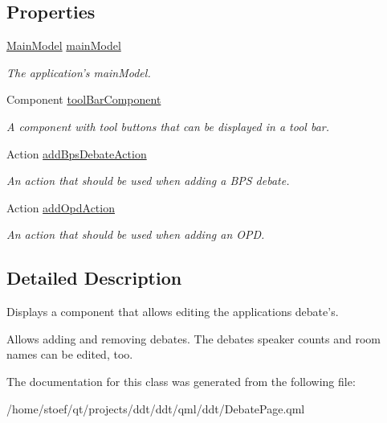 \subsection*{Properties}
\begin{DoxyCompactItemize}
\item 
\hypertarget{classDebatePage_a2591e3863cd1d80095d1c2a259bcf77b}{\hyperlink{classMainModel}{Main\-Model} \hyperlink{classDebatePage_a2591e3863cd1d80095d1c2a259bcf77b}{main\-Model}}\label{classDebatePage_a2591e3863cd1d80095d1c2a259bcf77b}

\begin{DoxyCompactList}\small\item\em The application's main\-Model. \end{DoxyCompactList}\item 
\hypertarget{classDebatePage_a6c33a9ff03852ccd00fd1a4b0ce88930}{Component \hyperlink{classDebatePage_a6c33a9ff03852ccd00fd1a4b0ce88930}{tool\-Bar\-Component}}\label{classDebatePage_a6c33a9ff03852ccd00fd1a4b0ce88930}

\begin{DoxyCompactList}\small\item\em A component with tool buttons that can be displayed in a tool bar. \end{DoxyCompactList}\item 
\hypertarget{classDebatePage_acbf69a0adb66d050aeea3f0e3b72c57d}{Action \hyperlink{classDebatePage_acbf69a0adb66d050aeea3f0e3b72c57d}{add\-Bps\-Debate\-Action}}\label{classDebatePage_acbf69a0adb66d050aeea3f0e3b72c57d}

\begin{DoxyCompactList}\small\item\em An action that should be used when adding a B\-P\-S debate. \end{DoxyCompactList}\item 
\hypertarget{classDebatePage_a9f0d42c01a1e321aaf9fb3af44b83d0b}{Action \hyperlink{classDebatePage_a9f0d42c01a1e321aaf9fb3af44b83d0b}{add\-Opd\-Action}}\label{classDebatePage_a9f0d42c01a1e321aaf9fb3af44b83d0b}

\begin{DoxyCompactList}\small\item\em An action that should be used when adding an O\-P\-D. \end{DoxyCompactList}\end{DoxyCompactItemize}


\subsection{Detailed Description}
Displays a component that allows editing the applications debate's. 

Allows adding and removing debates. The debates speaker counts and room names can be edited, too. 

The documentation for this class was generated from the following file\-:\begin{DoxyCompactItemize}
\item 
/home/stoef/qt/projects/ddt/ddt/qml/ddt/Debate\-Page.\-qml\end{DoxyCompactItemize}
